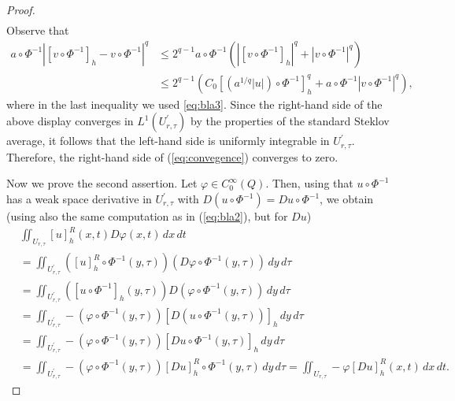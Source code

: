 \documentclass[10pt,a4paper]{amsart}
\numberwithin{equation}{section}
\begin{document}
\begin{proof}
\begin{align}
\end{align}
Observe that 
\begin{align*}
a\circ\Phi^{-1}\left|[v\circ\Phi^{-1}]_{h}-v\circ\Phi^{-1}\right|^{q}&\leq2^{q-1}a\circ\Phi^{-1}\left(\left|[v\circ\Phi^{-1}]_{h}\right|^{q}+\left|v\circ\Phi^{-1}\right|^{q}\right) \\&\leq2^{q-1}\left(C_0 [(a^{1/q}|u|)\circ\Phi^{-1}]_h^q +a\circ\Phi^{-1}|v\circ\Phi^{-1}|^q \right),
\end{align*}
where in the last inequality we used \eqref{eq:bla3}. Since the right-hand side of the above display converges in $L^{1}(U^{\prime}_{r, \tau})$ by the properties of the standard Steklov average, it follows that the left-hand side
is uniformly integrable in $U^{\prime}_{r, \tau}$. Therefore, the right-hand
side of (\ref{eq:convegence}) converges to zero.

Now we prove the second assertion. Let $\varphi\in C_{0}^{\infty}(Q)$. Then, using that
$u\circ\Phi^{-1}$ has a weak space derivative in $U^{\prime}_{r, \tau}$ with
$D(u\circ\Phi^{-1})=Du\circ\Phi^{-1}$, we obtain (using also the
same computation as in (\ref{eq:bla2}), but for $Du$)
\begin{align*}
&\iint_{U_{r, \tau}}[u]_{h}^{R}(x, t)D\varphi(x,t)\,dx\,dt\\
& =\iint_{U^{\prime}_{r, \tau}}([u]_{h}^{R}\circ\Phi^{-1}(y, \tau))(D\varphi\circ\Phi^{-1}(y, \tau))\,dy\, d\tau\\
 & =\iint_{U^{\prime}_{r, \tau}}([u\circ\Phi^{-1}]_{h}(y, \tau))D(\varphi\circ\Phi^{-1}(y, \tau))\,dy\, d\tau\\
 & =\iint_{U^{\prime}_{r, \tau}}-(\varphi\circ\Phi^{-1}(y, \tau))[D(u\circ\Phi^{-1}(y, \tau))]_{h}\,dy\, d\tau\\
 & =\iint_{U^{\prime}_{r, \tau}}-(\varphi\circ\Phi^{-1}(y, \tau))[Du\circ\Phi^{-1}(y, \tau)]_{h}\,dy\, d\tau\\
 & =\iint_{U^{\prime}_{r, \tau}}-(\varphi\circ\Phi^{-1}(y, \tau))[Du]_{h}^{R}\circ\Phi^{-1}(y, \tau)\,dy\, d\tau=\iint_{U_{r, \tau}}-\varphi[Du]_{h}^{R}(x, t)\,dx\,dt.
\end{align*}


\end{proof}
\end{document}
